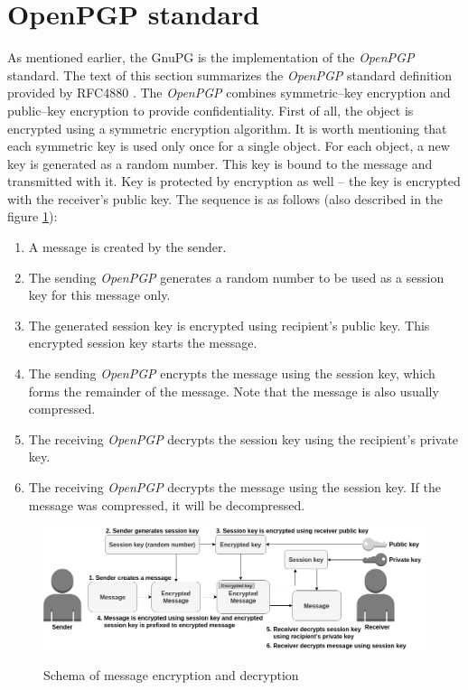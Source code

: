 \section{OpenPGP standard}
As mentioned earlier, the GnuPG is the implementation of the \textit{OpenPGP} standard. The text of this section summarizes the \textit{OpenPGP} standard definition provided by RFC4880 \cite{RFC4880}. The \textit{OpenPGP} combines symmetric--key encryption and public--key encryption to provide confidentiality. First of all, the object is encrypted using a symmetric encryption algorithm. It is worth mentioning that each symmetric key is used only once for a single object. For each object, a new key is generated as a random number. This key is bound to the message and transmitted with it. Key is protected by encryption as well -- the key is encrypted with the receiver's public key. The sequence is as follows (also described in the figure \ref{img:messageEncryption}):
\begin{enumerate}
    \item A message is created by the sender.
    \item The sending \textit{OpenPGP} generates a random number to be used as a session key for this message only.
    \item The generated session key is encrypted using recipient's public key. This encrypted session key starts the message.
    \item The sending \textit{OpenPGP} encrypts the message using the session key, which forms the remainder of the message. Note that the message is also usually compressed.
    \item The receiving \textit{OpenPGP} decrypts the session key using the recipient's private key.
    \item The receiving \textit{OpenPGP} decrypts the message using the session key. If the message was compressed, it will be decompressed.
\end{enumerate}

\begin{figure}[H]
    \begin{center}
        \label{img:messageEncryption}
        \includegraphics[width=1.0\textwidth]{obrazky-figures/messageEncryption.png}
        \caption{Schema of message encryption and decryption}
    \end{center}
\end{figure}

